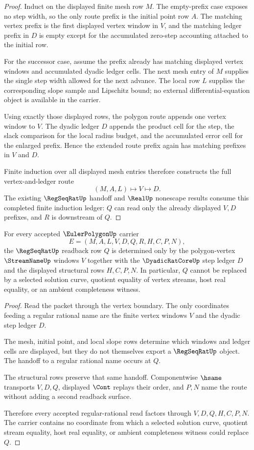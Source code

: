 \begin{proof}
Induct on the displayed finite mesh row $M$. The empty-prefix case exposes no step width, so the only route prefix is the initial point row $A$. The matching vertex prefix is the first displayed vertex window in $V$, and the matching ledger prefix in $D$ is empty except for the accumulated zero-step accounting attached to the initial row.

For the successor case, assume the prefix already has matching displayed vertex windows and accumulated dyadic ledger cells. The next mesh entry of $M$ supplies the single step width allowed for the next advance. The local row $L$ supplies the corresponding slope sample and Lipschitz bound; no external differential-equation object is available in the carrier.

Using exactly those displayed rows, the polygon route appends one vertex window to $V$. The dyadic ledger $D$ appends the product cell for the step, the slack comparison for the local radius budget, and the accumulated error cell for the enlarged prefix. Hence the extended route prefix again has matching prefixes in $V$ and $D$.

Finite induction over all displayed mesh entries therefore constructs the full vertex-and-ledger route
$$
(M,A,L)\longmapsto V\longmapsto D .
$$
The existing $\RegSeqRatUp$ handoff and $\RealUp$ nonescape results consume this completed finite induction ledger: $Q$ can read only the already displayed $V,D$ prefixes, and $R$ is downstream of $Q$.
\end{proof}

\begin{theorem}
\label{thm:euler-polygon-regseqrat-handoff}
For every accepted $\EulerPolygonUp$ carrier
$$
E=(M,A,L,V,D,Q,R,H,C,P,N),
$$
the $\RegSeqRatUp$ readback row $Q$ is determined only by the polygon-vertex $\StreamNameUp$ windows $V$ together with the $\DyadicRatCoreUp$ step ledger $D$ and the displayed structural rows $H,C,P,N$. In particular, $Q$ cannot be replaced by a selected solution curve, quotient equality of vertex streams, host real equality, or an ambient completeness witness.
\end{theorem}
\begin{proof}
Read the packet through the vertex boundary. The only coordinates feeding a regular rational name are the finite vertex windows $V$ and the dyadic step ledger $D$.

The mesh, initial point, and local slope rows determine which windows and ledger cells are displayed, but they do not themselves export a $\RegSeqRatUp$ object. The handoff to a regular rational name occurs at $Q$.

The structural rows preserve that same handoff. Componentwise $\hsame$ transports $V,D,Q$, displayed $\Cont$ replays their order, and $P,N$ name the route without adding a second readback surface.

Therefore every accepted regular-rational read factors through $V,D,Q,H,C,P,N$. The carrier contains no coordinate from which a selected solution curve, quotient stream equality, host real equality, or ambient completeness witness could replace $Q$.
\end{proof}

